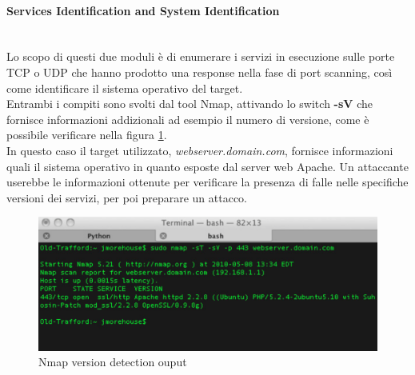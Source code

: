 \paragraph{Services Identification and System Identification}\mbox{}\\
Lo scopo di questi due moduli è di enumerare i servizi in esecuzione sulle porte TCP o UDP che hanno prodotto una response nella fase di port scanning, così come identificare il sistema operativo del target.\\
Entrambi i compiti sono svolti dal tool Nmap, attivando lo switch \textbf{-sV} che fornisce informazioni addizionali ad esempio il numero di versione, come è possibile verificare nella figura \ref{nmap_sv_img}.\\
In questo caso il target utilizzato, \emph{webserver.domain.com}, fornisce informazioni quali il sistema operativo in quanto esposte dal server web Apache. Un attaccante userebbe le informazioni ottenute per verificare la presenza di falle nelle specifiche versioni dei servizi, per poi preparare un attacco.
\begin{figure}[hbtp]
	\centering
	\includegraphics[scale=.3]{imgs/attack/nmap_sv.png}
	\caption{Nmap version detection ouput}
	\label{nmap_sv_img}
\end{figure}


